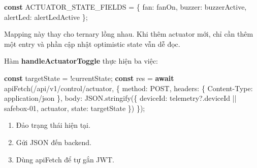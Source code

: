 \documentclass[11pt,oneside,openany]{book}
\renewcommand{\texttt}[1]{{\ttfamily\small #1}}
\newenvironment{Shaded}{\begin{snugshade}}{\end{snugshade}}
\newcommand{\AttributeTok}[1]{\textcolor[rgb]{0.16,0.50,0.73}{#1}}
\newcommand{\BuiltInTok}[1]{\textcolor[rgb]{0.50,0.55,0.55}{#1}}
\newcommand{\ControlFlowTok}[1]{\textcolor[rgb]{0.99,0.74,0.29}{\textbf{#1}}}
\newcommand{\DataTypeTok}[1]{\textcolor[rgb]{0.16,0.50,0.73}{#1}}
\newcommand{\FunctionTok}[1]{\textcolor[rgb]{0.56,0.27,0.68}{#1}}
\newcommand{\KeywordTok}[1]{\textcolor[rgb]{0.81,0.81,0.76}{\textbf{#1}}}
\newcommand{\NormalTok}[1]{\textcolor[rgb]{0.81,0.81,0.76}{#1}}
\newcommand{\OperatorTok}[1]{\textcolor[rgb]{0.81,0.81,0.76}{#1}}
\newcommand{\StringTok}[1]{\textcolor[rgb]{0.96,0.31,0.31}{#1}}
\renewenvironment{Shaded}{%
  \def\FrameCommand{\fboxsep=8pt\colorbox{shadecolor}}%
  \MakeFramed{\advance\hsize-\width\FrameRestore}%
}{\endMakeFramed}
\providecommand{\tightlist}{\setlength{\itemsep}{1pt}\setlength{\parskip}{0pt}}
\begin{document}
\begin{Shaded}
\begin{Highlighting}[]
\KeywordTok{const}\NormalTok{ ACTUATOR\_STATE\_FIELDS }\OperatorTok{=}\NormalTok{ \{}
  \DataTypeTok{fan}\OperatorTok{:} \StringTok{\textquotesingle{}fanOn\textquotesingle{}}\OperatorTok{,}
  \DataTypeTok{buzzer}\OperatorTok{:} \StringTok{\textquotesingle{}buzzerActive\textquotesingle{}}\OperatorTok{,}
  \DataTypeTok{alertLed}\OperatorTok{:} \StringTok{\textquotesingle{}alertLedActive\textquotesingle{}}
\NormalTok{\}}\OperatorTok{;}
\end{Highlighting}
\end{Shaded}

Mapping này thay cho ternary lồng nhau. Khi thêm actuator mới, chỉ cần
thêm một entry và phần cập nhật optimistic state vẫn dễ đọc.

Hàm \textbf{handleActuatorToggle} thực hiện ba việc:

\begin{Shaded}
\begin{Highlighting}[]
\KeywordTok{const}\NormalTok{ targetState }\OperatorTok{=} \OperatorTok{!}\NormalTok{currentState}\OperatorTok{;}
\KeywordTok{const}\NormalTok{ res }\OperatorTok{=} \ControlFlowTok{await} \FunctionTok{apiFetch}\NormalTok{(}\StringTok{\textquotesingle{}/api/v1/control/actuator\textquotesingle{}}\OperatorTok{,}\NormalTok{ \{}
  \DataTypeTok{method}\OperatorTok{:} \StringTok{\textquotesingle{}POST\textquotesingle{}}\OperatorTok{,}
  \DataTypeTok{headers}\OperatorTok{:}\NormalTok{ \{ }\StringTok{\textquotesingle{}Content{-}Type\textquotesingle{}}\OperatorTok{:} \StringTok{\textquotesingle{}application/json\textquotesingle{}}\NormalTok{ \}}\OperatorTok{,}
  \DataTypeTok{body}\OperatorTok{:} \BuiltInTok{JSON}\OperatorTok{.}\FunctionTok{stringify}\NormalTok{(\{}
    \DataTypeTok{deviceId}\OperatorTok{:}\NormalTok{ telemetry}\OperatorTok{?.}\AttributeTok{deviceId} \OperatorTok{||} \StringTok{\textquotesingle{}safebox{-}01\textquotesingle{}}\OperatorTok{,}
\NormalTok{    actuator}\OperatorTok{,}
    \DataTypeTok{state}\OperatorTok{:}\NormalTok{ targetState}
\NormalTok{  \})}
\NormalTok{\})}\OperatorTok{;}
\end{Highlighting}
\end{Shaded}

\begin{enumerate}
\def\labelenumi{\arabic{enumi}.}
\tightlist
\item
  Đảo trạng thái hiện tại.
\item
  Gửi JSON đến backend.
\item
  Dùng \texttt{apiFetch} để tự gắn JWT.
\end{enumerate}
\end{document}
